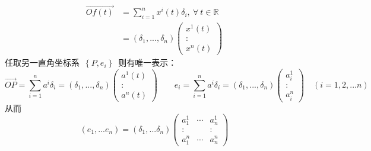 \begin{align*}
\overrightarrow{Of(t)}&=\sum_{i=1}^{n}x^i(t)\delta_i,\ \forall\ t\in \mathbb{R}
\\
                      &=(\delta_1,...,\delta_n)  \left( \begin{array}{c}
                                                             x^1(t)
                                                              \\
                                                              \colon
                                                              \\
                                                              x^n(t)                                          
                                                        \end{array}  \right)
\end{align*}
任取另一直角坐标系\ $\left\lbrace P,e_i \right\rbrace $\ 则有唯一表示：
$$\overrightarrow{OP}=\sum_{i=1}^{n}a^i\delta_i=(\delta_1,...,\delta_n)
                                                      \left(        \begin{array}{c}
                                                                    a^1(t)
                                                                    \\
                                                                    \colon
                                                                    \\
                                                                    a^n(t)   
                                                                    \end{array}  \right)
 \qquad
 e_i=\sum_{i=1}^{n}a^i\delta_i=(\delta_1,...,\delta_n)  \left( \begin{array}{c}
                                                                  a^1_i
                                                                  \\
                                                                  \colon
                                                                  \\
                                                                  a^n_i
                                                               \end{array}  \right)
                                                               \quad (i=1,2,...n)                                           
$$
从而
$$
(e_1,...e_n)=(\delta_1,...\delta_n) \left( \begin{array}{ccc}
                                           a^1_1  &  \cdots  &  a^1_n
                                           \\ 
                                           \colon &          &  \colon
                                           \\
                                           a^n_1  &  \cdots  &  a^n_n
                                           \end{array} \right)
$$
